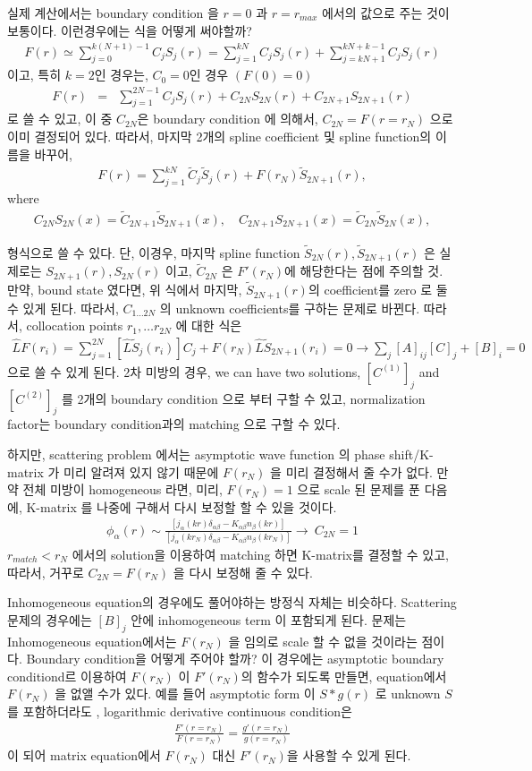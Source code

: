 \documentclass[10pt]{book}
\newcommand{\bea}{\begin{eqnarray}}
\newcommand{\eea}{\end{eqnarray}}
\begin{document}
실제 계산에서는 boundary condition 을 $r=0$ 과
$r=r_{max}$ 에서의 값으로 주는 것이 보통이다. 
이런경우에는 
식을 어떻게 써야할까? 
\bea
F(r)\simeq \sum_{j=0}^{k(N+1)-1}C_j S_j(r)
     =\sum_{j=1}^{kN} C_j S_j(r)
     +\sum_{j=kN+1}^{kN+k-1} C_j S_j(r)    
\eea
이고, 특히 $k=2$인 경우는, $C_0=0$인 경우 $(F(0)=0)$
\bea
F(r)&=&\sum_{j=1}^{2N-1} C_j S_j(r)
       +C_{2N}S_{2N}(r)+C_{2N+1}S_{2N+1}(r)   
\eea
로 쓸 수 있고, 이 중 $C_{2N}$은 boundary condition
에 의해서, $C_{2N}=F(r=r_N)$ 으로 이미 결정되어 있다.
따라서, 마지막 2개의 spline coefficient 및
spline function의 이름을 바꾸어, 
\bea
F(r)=\sum_{j=1}^{kN} \tilde{C}_j \tilde{S}_j(r)
       +F(r_N)\tilde{S}_{2N+1}(r) ,   
\eea
where
\bea 
C_{2N}S_{2N}(x)=\tilde{C}_{2N+1}\tilde{S}_{2N+1}(x),\quad
C_{2N+1}S_{2N+1}(x)=\tilde{C}_{2N}\tilde{S}_{2N}(x),
\eea 

형식으로 쓸 수 있다. 단, 이경우, 마지막 
spline function
$\tilde{S}_{2N}(r), \tilde{S}_{2N+1}(r)$ 은 
실제로는 $S_{2N+1}(r), S_{2N}(r)$ 이고,
$\tilde{C}_{2N}$ 은 $F'(r_N)$에 해당한다는 점에 주의할 것. 만약, bound state
였다면, 위 식에서 마지막, $\tilde{S}_{2N+1}(r)$의 coefficient를 zero
로 둘 수 있게 된다. 따라서, $C_{1\dots 2N}$ 의 unknown
coefficients를 구하는 문제로 바뀐다.
따라서, collocation points $r_1,\dots r_{2N}$ 에 대한 식은
\bea
\hat{L}F(r_i)=\sum_{j=1}^{2N}[\hat{L}\tilde{S}_j(r_i)]C_j
              +F(r_N)\hat{L}\tilde{S}_{2N+1}(r_i)=0
\to \sum_j [A]_{ij}[C]_j +[B]_i=0  
\eea
으로 쓸 수 있게 된다. 2차 미방의 경우, we can have two solutions,
$[C^{(1)}]_j$ and $[C^{(2)}]_j$ 를 2개의 boundary condition
으로 부터 구할 수 있고, normalization factor는 boundary condition과의
matching 으로 구할 수 있다.

하지만, scattering problem 에서는 asymptotic wave function 
의  phase shift/K-matrix 가
미리 알려져 있지 않기 때문에 $F(r_N)$ 을 미리 결정해서 줄 수가 없다. 
만약 전체 미방이 homogeneous 라면, 미리, $F(r_N)=1$ 으로
scale 된 문제를 푼 다음에, K-matrix 를 나중에 구해서 다시 보정할 할 수 있을 것이다. 
\bea
\phi_{\alpha}(r)\sim \frac{[j_\alpha(kr)\delta_{\alpha\beta}
                    -K_{\alpha\beta} n_\beta(kr)]}
                    {[j_\alpha(kr_N)\delta_{\alpha\beta}
                    -K_{\alpha\beta} n_\beta(kr_N)]}
                    \to\ C_{2N}=1
\eea
$r_{match}<r_N$ 에서의 solution을 이용하여 matching 
하면 K-matrix를 결정할 수 있고, 따라서, 거꾸로 $C_{2N}=F(r_N)$ 을 다시 
보정해 줄 수 있다.     

Inhomogeneous equation의 경우에도 풀어야하는 방정식 자체는 비슷하다. 
Scattering 문제의 경우에는 $[B]_j$ 안에 inhomogeneous term 이 포함되게 된다. 
문제는 Inhomogeneous equation에서는 $F(r_N)$ 을 임의로 
scale 할 수 없을 것이라는 점이다. 
Boundary condition을 어떻게 주어야 할까? 이 경우에는 
asymptotic boundary conditiond르 이용하여 $F(r_N)$ 이 
$F'(r_N)$의 함수가 되도록 만들면, equation에서 $F(r_N)$ 을 없앨 수가 있다.  
예를 들어 asymptotic form 이 $S*g(r)$ 로 unknown $S$ 를 포함하더라도 ,
logarithmic derivative continuous condition은 
\bea 
\frac{F'(r=r_N)}{F(r=r_N)}=\frac{g'(r=r_N)}{g(r=r_N)}
\eea 
이 되어 matrix equation에서 $F(r_N)$ 대신 $F'(r_N)$을 사용할 수 있게 된다. 
\end{document}

